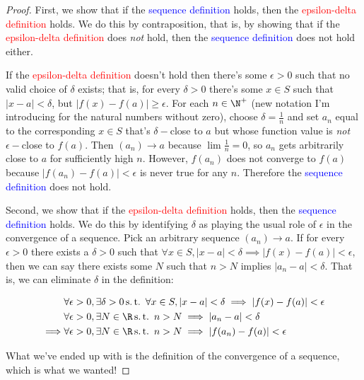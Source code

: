 \documentclass[./analysis.tex]{subfiles}
\begin{document}
    \begin{proof}
        First, we show that if the \textcolor{blue}{sequence definition} holds, then the \textcolor{red}{epsilon-delta definition} holds. We do this by contraposition, that is, by showing that if the \textcolor{red}{epsilon-delta definition} does \emph{not} hold, then the \textcolor{blue}{sequence definition} does not hold either.

        If the \textcolor{red}{epsilon-delta definition} doesn't hold then there's some $\epsilon > 0$ such that no valid choice of $\delta$ exists; that is, for every $\delta > 0$ there's some $x \in S$ such that $|x - a| < \delta$, but $|f(x) - f(a)| \geq \epsilon$. For each $n \in \N^+$ (new notation I'm introducing for the natural numbers without zero), choose $\delta = \frac{1}{n}$ and set $a_n$ equal to the corresponding $x \in S$ that's $\delta-$close to $a$ but whose function value is \emph{not} $\epsilon-$close to $f(a)$. Then $(a_n) \to a$ because $\lim \frac{1}{n} = 0$, so $a_n$ gets arbitrarily close to $a$ for sufficiently high $n$. However, $f(a_n)$ does not converge to $f(a)$ because $|f(a_n) - f(a)| < \epsilon$ is never true for any $n$. Therefore the \textcolor{blue}{sequence definition} does not hold.

        Second, we show that if the \textcolor{red}{epsilon-delta definition} holds, then the \textcolor{blue}{sequence definition} holds. We do this by identifying $\delta$ as playing the usual role of $\epsilon$ in the convergence of a sequence. Pick an arbitrary sequence $(a_n) \to a$. If for every $\epsilon > 0$ there exists a $\delta > 0$ such that $\forall x \in S, |x - a| < \delta \implies |f(x) - f(a)| < \epsilon$, then we can say there exists some $N$ such that $n > N$ implies $|a_n - a| < \delta$. That is, we can eliminate $\delta$ in the definition:
        
        \begin{align*}
            &\forall \epsilon > 0, \exists \delta > 0 \st \ \forall x \in S, |x - a| < \delta \implies |f(x) - f(a)| < \epsilon\\
            &\forall \epsilon > 0, \exists N \in \R \st \ n > N \implies |a_n - a| < \delta\\
            \implies &\forall \epsilon > 0, \exists N \in \R \st \ n > N \implies |f(a_n) - f(a)| < \epsilon
        \end{align*}

        What we've ended up with is the definition of the convergence of a sequence, which is what we wanted!
    \end{proof}
\end{document}
